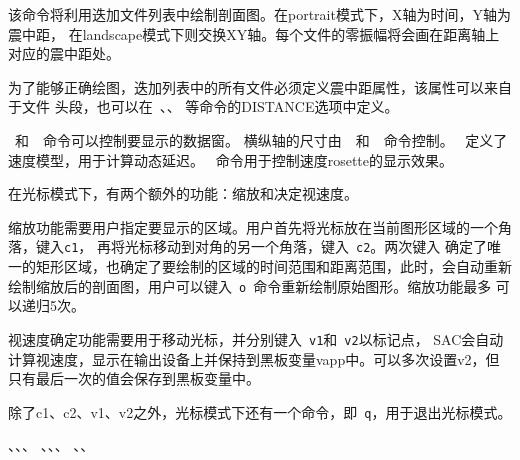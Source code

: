 该命令将利用迭加文件列表中绘制剖面图。在portrait模式下，X轴为时间，Y轴为震中距，
在landscape模式下则交换XY轴。每个文件的零振幅将会画在距离轴上对应的震中距处。

为了能够正确绘图，迭加列表中的所有文件必须定义震中距属性，该属性可以来自于文件
头段，也可以在~、、
等命令的DISTANCE选项中定义。

~和~~命令可以控制要显示的数据窗。
横纵轴的尺寸由~~和~~命令控制。
~定义了速度模型，用于计算动态延迟。
~命令用于控制速度rosette的显示效果。

在光标模式下，有两个额外的功能：缩放和决定视速度。

缩放功能需要用户指定要显示的区域。用户首先将光标放在当前图形区域的一个角落，键入\verb+c1+，
再将光标移动到对角的另一个角落，键入~\verb+c2+。两次键入
确定了唯一的矩形区域，也确定了要绘制的区域的时间范围和距离范围，此时，会自动重新
绘制缩放后的剖面图，用户可以键入~\verb+o+~命令重新绘制原始图形。缩放功能最多
可以递归5次。

视速度确定功能需要用于移动光标，并分别键入~\verb+v1+和~\verb+v2+以标记点，
SAC会自动计算视速度，显示在输出设备上并保持到黑板变量vapp中。可以多次设置v2，但
只有最后一次的值会保存到黑板变量中。

除了c1、c2、v1、v2之外，光标模式下还有一个命令，即~\verb+q+，用于退出光标模式。

、、、
、、、
、、
